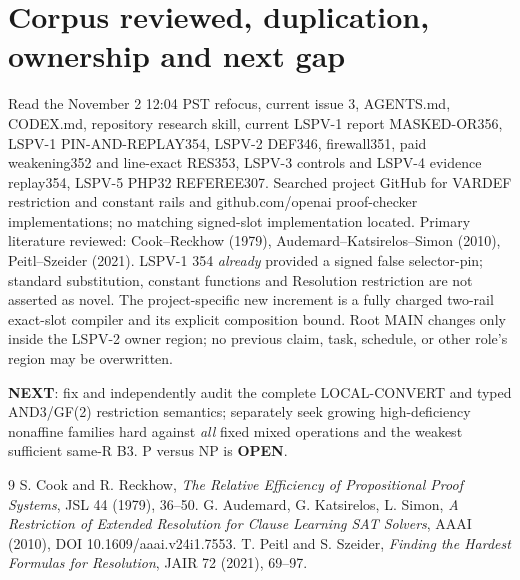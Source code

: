 \documentclass[11pt]{article}
\begin{document}
\section*{Corpus reviewed, duplication, ownership and next gap}
Read the November 2 12:04 PST refocus, current issue 3, AGENTS.md, CODEX.md, repository research skill, current LSPV-1 report MASKED-OR356, LSPV-1 PIN-AND-REPLAY354, LSPV-2 DEF346, firewall351, paid weakening352 and line-exact RES353, LSPV-3 controls and LSPV-4 evidence replay354, LSPV-5 PHP32 REFEREE307. Searched project GitHub for VARDEF restriction and constant rails and github.com/openai proof-checker implementations; no matching signed-slot implementation located. Primary literature reviewed: Cook--Reckhow (1979), Audemard--Katsirelos--Simon (2010), Peitl--Szeider (2021). LSPV-1 354 \emph{already} provided a signed false selector-pin; standard substitution, constant functions and Resolution restriction are not asserted as novel. The project-specific new increment is a fully charged two-rail exact-slot compiler and its explicit composition bound. Root MAIN changes only inside the LSPV-2 owner region; no previous claim, task, schedule, or other role's region may be overwritten.

\noindent\textbf{NEXT}: fix and independently audit the complete LOCAL-CONVERT and typed AND3/GF(2) restriction semantics; separately seek growing high-deficiency nonaffine families hard against \emph{all} fixed mixed operations and the weakest sufficient same-R B3. P versus NP is \textbf{OPEN}.
\begin{thebibliography}{9}
 S. Cook and R. Reckhow, \emph{The Relative Efficiency of Propositional Proof Systems}, JSL 44 (1979), 36--50.
 G. Audemard, G. Katsirelos, L. Simon, \emph{A Restriction of Extended Resolution for Clause Learning SAT Solvers}, AAAI (2010), DOI 10.1609/aaai.v24i1.7553.
 T. Peitl and S. Szeider, \emph{Finding the Hardest Formulas for Resolution}, JAIR 72 (2021), 69--97.
\end{thebibliography}
\end{document}
